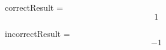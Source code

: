 \documentclass{article}
\begin{document}
correctResult = 
    $$ 1 $$
    

incorrectResult = 
    $$ -1 $$
    
\end{document}
